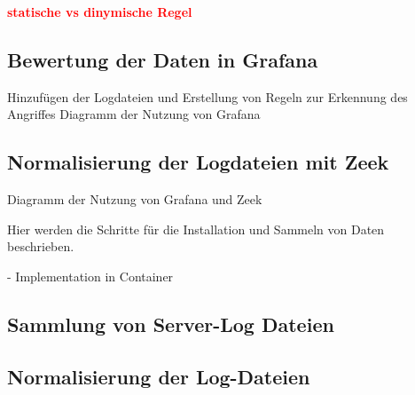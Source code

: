 \textcolor{red}{\textbf{statische vs dinymische Regel}}





\subsection{Bewertung der Daten in Grafana}
Hinzufügen der Logdateien und Erstellung von Regeln zur Erkennung des Angriffes
Diagramm der Nutzung von Grafana

\subsection{Normalisierung der Logdateien mit Zeek}
Diagramm der Nutzung von Grafana und Zeek

Hier werden die Schritte für die Installation und Sammeln von Daten beschrieben.

- Implementation in Container %


\subsection{Sammlung von Server-Log Dateien}

\subsection{Normalisierung der Log-Dateien}





